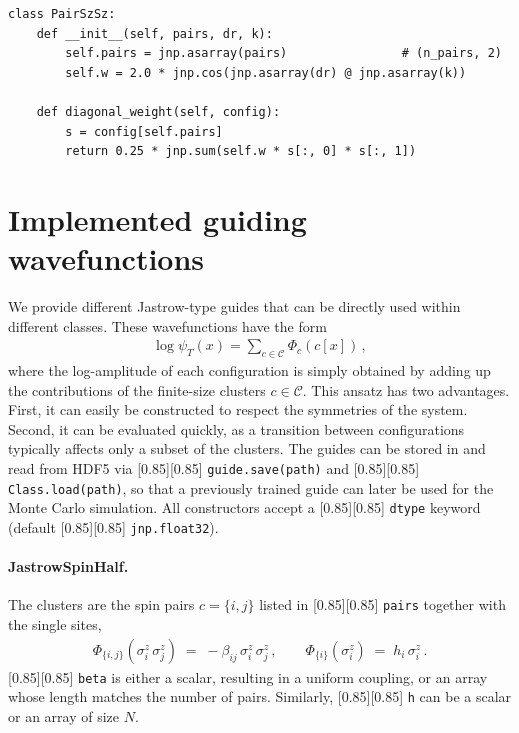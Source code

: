 \documentclass{SciPost}
\newcommand{\pyinline}[1]{\begingroup\setlength{\fboxsep}{0pt}%
  \colorbox{gray!15}{\raisebox{0pt}[0.85\ht\strutbox][0.85\dp\strutbox]{%
    \hspace{1pt}\lstinline{#1}\hspace{1pt}}}\endgroup}
\begin{document}
\begin{lstlisting}
class PairSzSz:
    def __init__(self, pairs, dr, k):
        self.pairs = jnp.asarray(pairs)                # (n_pairs, 2)
        self.w = 2.0 * jnp.cos(jnp.asarray(dr) @ jnp.asarray(k))

    def diagonal_weight(self, config):
        s = config[self.pairs]
        return 0.25 * jnp.sum(self.w * s[:, 0] * s[:, 1])
\end{lstlisting}

\section{Implemented guiding wavefunctions}\label{app:guides}
We provide different Jastrow-type guides that can be directly used within different classes.
%
These wavefunctions have the form
\begin{align}
	\log \psi_T(x) =  \sum_{c\in\mathcal{C}} \Phi_c(c[x])\,,
	\label{eq:cluster_guide_app}
\end{align}
where the log-amplitude of each configuration is simply obtained by adding up the contributions of the finite-size clusters $c\in\mathcal{C}$.
%
This ansatz has two advantages.
%
First, it can easily be constructed to respect the symmetries of the system.
%
Second, it can be evaluated quickly, as a transition between configurations typically affects only a subset of the clusters.
%
The guides can be stored in and read from HDF5 via \pyinline{guide.save(path)} and \pyinline{Class.load(path)}, so that a previously trained guide can later be used for the Monte Carlo simulation.
%
All constructors accept a \pyinline{dtype} keyword (default \pyinline{jnp.float32}).

\paragraph{JastrowSpinHalf.}
The clusters are the spin pairs $c=\{i,j\}$ listed in \pyinline{pairs} together with the single sites,
\begin{align}
	\Phi_{\{i,j\}}(\sigma^z_i\, \sigma^z_j) \;=\; -\beta_{ij}\, \sigma^z_i\, \sigma^z_j\,,
	\qquad
	\Phi_{\{i\}}( \sigma^z_i) \;=\; h_i\, \sigma^z_i\,.
	\label{eq:phi_jastrow}
\end{align}
\pyinline{beta} is either a scalar, resulting in a uniform coupling, or an array whose length matches the number of pairs.
%
Similarly, \pyinline{h} can be a scalar or an array of size $N$.\\
\end{document}
